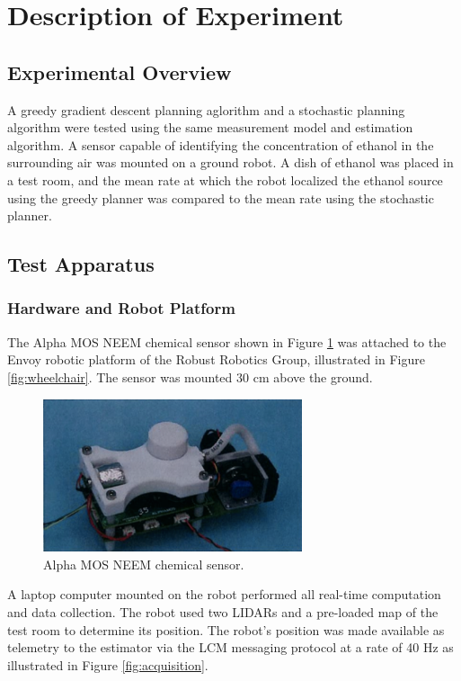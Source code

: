 \documentclass[submit, 12pt]{aiaa-pretty-modified}
\begin{document}
\section{Description of Experiment}
\subsection{Experimental Overview}
A greedy gradient descent planning aglorithm and a
stochastic planning algorithm were tested using the
same measurement model and estimation algorithm. A sensor capable of identifying the
concentration of ethanol in the surrounding air was mounted on a ground
robot. A dish of ethanol was placed in a test room, and the mean rate at which the robot localized the ethanol source
using the greedy planner was compared to the mean rate using the
stochastic planner.

\subsection{Test Apparatus}
\label{sec:design}
\subsubsection{Hardware and Robot Platform}

The Alpha MOS NEEM chemical sensor shown in Figure \ref{fig:sensor} was
attached to the Envoy robotic platform of the Robust Robotics Group, illustrated in Figure \ref{fig:wheelchair}.  The sensor was mounted
30 cm above the ground.


\begin{figure}
\begin{center}
\includegraphics[width=3in]{img/sensor.pdf}
\caption{Alpha MOS NEEM chemical sensor.}
\label{fig:sensor}
\end{center}
\end{figure}

A laptop computer
mounted on the robot performed all real-time computation and data
collection.  The robot used two LIDARs and a pre-loaded map of the
test room to determine its position.  The robot's position was made available
as telemetry to the estimator via the LCM messaging protocol at a rate
of 40 Hz as
illustrated in Figure \ref{fig:acquisition}.
\end{document}
